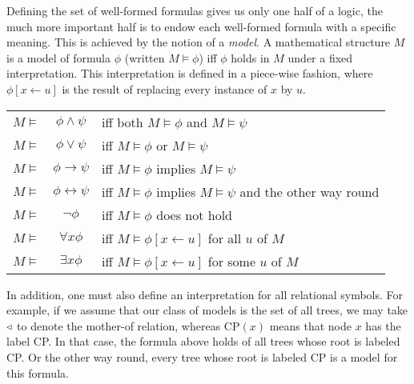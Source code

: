 Defining the set of well-formed formulas gives us only one half of a logic, the much more important half is to endow each well-formed formula with a specific meaning.
This is achieved by the notion of a \emph{model}.
A mathematical structure $M$ is a model of formula $\phi$ (written $M \models \phi$) iff $\phi$ holds in $M$ under a fixed interpretation.
This interpretation is defined in a piece-wise fashion, where $\phi[x \leftarrow u]$ is the result of replacing every instance of $x$ by $u$.
%
\begin{center}
    \begin{tabular}{rcl}
        $M \models$ & $\phi \wedge \psi$          & iff both $M \models \phi$ and $M \models \psi$\\
        $M \models$ & $\phi \vee \psi$            & iff $M \models \phi$ or $M \models \psi$\\
        $M \models$ & $\phi \rightarrow \psi$     & iff $M \models \phi$ implies $M \models \psi$\\
        $M \models$ & $\phi \leftrightarrow \psi$ & iff $M \models \phi$ implies $M \models \psi$ and the other way round\\
        $M \models$ & $\neg \phi$                 & iff $M \models \phi$ does not hold\\
        $M \models$ & $\forall x \phi$            & iff $M \models \phi[x \leftarrow u]$ for all $u$ of $M$\\
        $M \models$ & $\exists x \phi$            & iff $M \models \phi[x \leftarrow u]$ for some $u$ of $M$\\
    \end{tabular}
\end{center}
%
In addition, one must also define an interpretation for all relational symbols.
For example, if we assume that our class of models is the set of all trees, we may take $\triangleleft$ to denote the mother-of relation, whereas $\mathrm{CP}(x)$ means that node $x$ has the label CP\@.
In that case, the formula above holds of all trees whose root is labeled CP\@.
Or the other way round, every tree whose root is labeled CP is a model for this formula.

